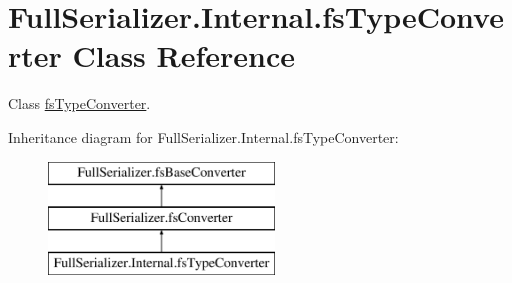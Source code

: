 \hypertarget{class_full_serializer_1_1_internal_1_1fs_type_converter}{}\section{Full\+Serializer.\+Internal.\+fs\+Type\+Converter Class Reference}
\label{class_full_serializer_1_1_internal_1_1fs_type_converter}


Class \hyperlink{class_full_serializer_1_1_internal_1_1fs_type_converter}{fs\+Type\+Converter}.  


Inheritance diagram for Full\+Serializer.\+Internal.\+fs\+Type\+Converter\+:\begin{figure}[H]
\begin{center}
\leavevmode
\includegraphics[height=3.000000cm]{class_full_serializer_1_1_internal_1_1fs_type_converter}
\end{center}
\end{figure}

